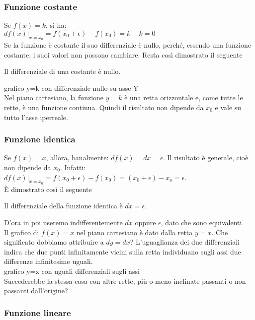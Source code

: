 \subsubsection{Funzione costante}
\label{subsec:diff01_diffcostante}
Se $f(x)=k$, si ha:\\
$df(x)|_{x=x_0}=f(x_0+\epsilon)-f(x_0)=k-k=0$\\
Se la funzione è costante il suo differenziale è nullo,
perché, essendo una funzione costante, i suoi valori non possono cambiare. Resta così 
dimostrato il seguente

\begin{teorema}
Il differenziale di una costante è nullo.
\end{teorema}

grafico y=k con differenziale nullo su asse Y\\

Nel piano cartesiano, la funzione  $y=k$ è una retta orizzontale e, come tutte
le rette, è una funzione continua. Quindi il risultato non dipende da $x_0$ e
vale su tutto l'asse iperreale.
\subsubsection{Funzione identica}
\label{diffidentica}
Se $f(x)=x$, allora, banalmente: $df(x)=dx=\epsilon$. Il risultato è
generale, cioè non dipende da $x_0$. Infatti:\\
$df(x)|_{x=x_0}=f(x_0+\epsilon)-f(x_0)=(x_0+\epsilon)-x_o=\epsilon$.\\
È dimostrato così il seguente
\begin{teorema}
Il differenziale della funzione identica è $dx=\epsilon$.
\end{teorema}
D'ora in poi useremo indifferentemente $dx$ oppure $\epsilon$, dato che
sono equivalenti.\\
Il grafico di $f(x)=x$ nel piano cartesiano è dato dalla retta $y=x$. 
Che significato dobbiamo attribuire a $dy=dx$?
L'uguaglianza dei due differenziali indica che due punti infinitamente
vicini sulla retta individuano sugli assi due differenze infinitesime uguali.\\

grafico y=x con uguali differenziali sugli assi\\

Succederebbe la stessa cosa con altre rette, più o meno inclinate passanti o
non passanti dall'origine?

\subsubsection{Funzione lineare}
\label{subsec:diff01_flineare}

